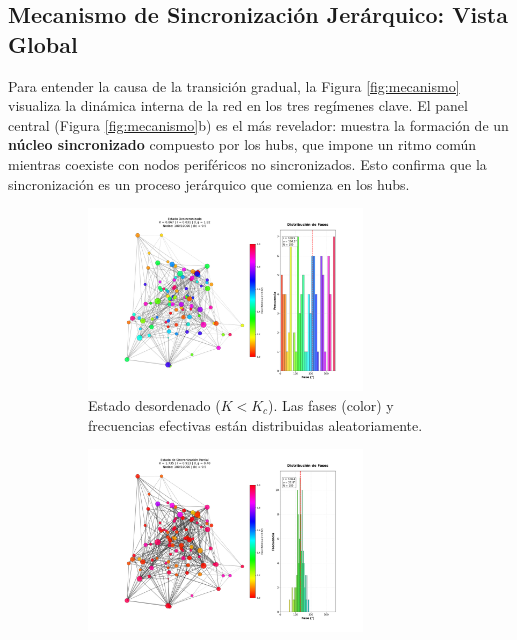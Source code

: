 \documentclass[12pt, a4paper]{article}
\begin{document}
\subsection{Mecanismo de Sincronización Jerárquico: Vista Global}
Para entender la causa de la transición gradual, la Figura \ref{fig:mecanismo} visualiza la dinámica interna de la red en los tres regímenes clave. El panel central (Figura \ref{fig:mecanismo}b) es el más revelador: muestra la formación de un \textbf{núcleo sincronizado} compuesto por los hubs, que impone un ritmo común mientras coexiste con nodos periféricos no sincronizados. Esto confirma que la sincronización es un proceso jerárquico que comienza en los hubs.

\begin{figure}[htbp]
    \centering
    \begin{subfigure}[b]{\textwidth}
        \centering
        \includegraphics[width=0.8\textwidth]{img/2_2.png}
        \caption{Estado desordenado ($K < K_c$). Las fases (color) y frecuencias efectivas están distribuidas aleatoriamente.}
        \label{fig:mecanismo_a}
    \end{subfigure}
    \begin{subfigure}[b]{\textwidth}
        \centering
        \includegraphics[width=0.8\textwidth]{img/2_4.png}

\end{subfigure}
\end{figure}
\end{document}
